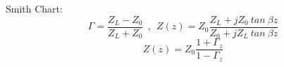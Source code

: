 \par
Smith Chart:
$${\Gamma} = \frac{Z_L - Z_0}{Z_L+Z_0} ~~ , ~~ Z(z) = Z_0 \frac{Z_L + jZ_0~tan~\beta z}{Z_0 + jZ_L~tan~\beta z}$$
$$ Z(z) = Z_0 \frac{1 + \Gamma_z}{1 - \Gamma_z} $$
\hspace{.02\textwidth}

\par
\setlength{\parindent}{0.0cm} %
